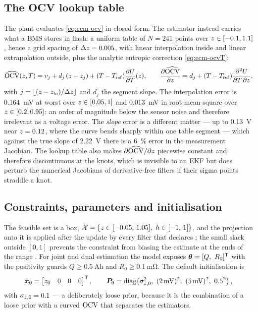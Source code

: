 \subsection{The OCV lookup table}
\label{sec:ecm-lut}
The plant evaluates \eqref{eq:ecm-ocv} in closed form. The estimator instead carries what a BMS
stores in flash: a uniform table of $N=241$ points over $z\in[-0.1,1.1]$, hence a grid spacing
of $\Delta z = 0.005$, with linear interpolation inside and linear extrapolation outside, plus
the analytic entropic correction \eqref{eq:ecm-ocvT}:
\begin{equation}
\widehat{\mathrm{OCV}}(z,T) = v_j + d_j\,(z - z_j) + (T-T_{\mathrm{ref}})\frac{\partial U}{\partial T}(z),
\qquad
\frac{\partial\widehat{\mathrm{OCV}}}{\partial z} = d_j + (T-T_{\mathrm{ref}})
 \frac{\partial^2 U}{\partial T\,\partial z},
\label{eq:ecm-lut}
\end{equation}
with $j = \lfloor(z-z_{\mathrm{lo}})/\Delta z\rfloor$ and $d_j$ the segment slope. The
interpolation error is \SI{0.164}{\milli\volt} at worst over $z\in[0.05,1]$ and
\SI{0.013}{\milli\volt} in root-mean-square over $z\in[0.2,0.95]$: an order of magnitude below
the sensor noise and therefore irrelevant as a voltage error. The \emph{slope} error is a
different matter --- up to \SI{0.13}{\volt} near $z=0.12$, where the curve bends sharply within
one table segment --- which against the true slope of \SI{2.22}{\volt} there is a
\SI{6}{\percent} error in the measurement Jacobian.
The lookup table also makes $\partial\widehat{\mathrm{OCV}}/\partial z$ piecewise constant and therefore
discontinuous at the knots, which is invisible to an EKF but does perturb the numerical Jacobians
of derivative-free filters if their sigma points straddle a knot.

\subsection{Constraints, parameters and initialisation}
The feasible set is a box,
$\mathcal{X} = \{z\in[-0.05,\,1.05],\ h\in[-1,\,1]\}$, and the projection onto it is applied
after the update by every filter that declares ; the small slack outside
$[0,1]$ prevents the constraint from biasing the estimate at the ends of the range
\cite{simon2010constraints}. For joint and dual estimation the model exposes
$\bm{\theta} = [Q,\ R_0]^{\mathsf{T}}$ with the positivity guards $Q\ge\SI{0.5}{\ampere\hour}$ and
$R_0\ge\SI{0.1}{\milli\ohm}$. The default initialisation is
\begin{equation}
\xhat_0 = \begin{bmatrix}\soc_0 & 0 & 0 & 0\end{bmatrix}^\T,\qquad
\mP_0 = \diag\!\left(\sigma_{\soc,0}^2,\ (\SI{2}{\milli\volt})^2,\ (\SI{5}{\milli\volt})^2,\
 0.5^2\right),
\label{eq:ecm-init}
\end{equation}
with $\sigma_{z,0}=0.1$ --- a deliberately loose prior, because it is the combination of a
loose prior with a curved $\mathrm{OCV}$ that separates the estimators.

